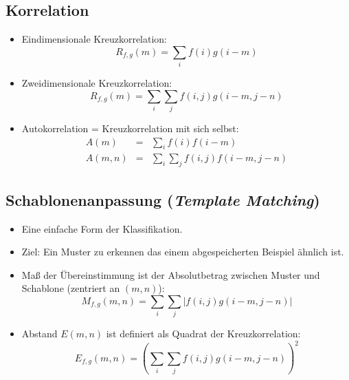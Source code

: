 \subsection{Korrelation}
\begin{itemize}
\item Eindimensionale Kreuzkorrelation: $$R_{f,g}(m) = \sum\limits_{i} f(i) g(i - m)$$
\item Zweidimensionale Kreuzkorrelation: $$R_{f,g}(m) = \sum\limits_i \sum\limits_j f(i,j) g(i-m,j-n)$$
\item Autokorrelation = Kreuzkorrelation mit sich selbst:
\begin{eqnarray*}
A(m) &=& \sum\limits_i f(i) f(i-m) \\ A(m,n) &=& \sum\limits_i \sum\limits_j f(i,j) f(i-m,j-n)
\end{eqnarray*}
\end{itemize}

\subsection{Schablonenanpassung (\textsl{Template Matching})}
\begin{itemize}
\item Eine einfache Form der Klassifikation.
\item Ziel: Ein Muster zu erkennen das einem abgespeicherten Beispiel ähnlich ist.
\item Maß der Übereinstimmung ist der Absolutbetrag zwischen Muster und Schablone (zentriert an $(m,n)$): $$M_{f,g}(m,n) = \sum\limits_i \sum\limits_j | f(i,j) g(i-m,j-n)|$$
\item Abstand $E(m,n)$ ist definiert als Quadrat der Kreuzkorrelation: $$E_{f,g} (m,n) = \left( \sum\limits_i \sum\limits_j f(i,j) g(i-m,j-n) \right)^2$$
\end{itemize}





\textit{}